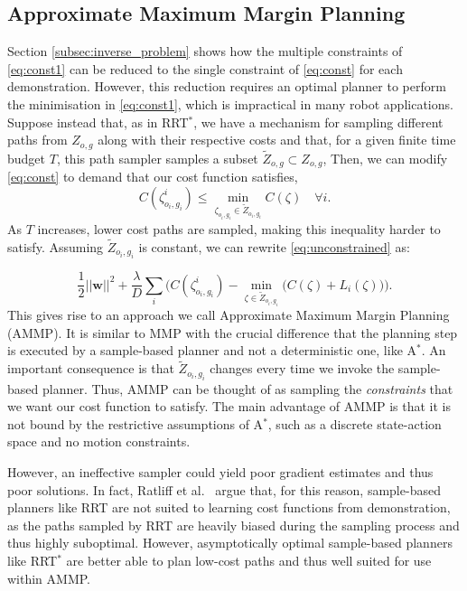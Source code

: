 \documentclass[a4paper,11pt]{report}
\begin{document}
\subsection{Approximate Maximum Margin Planning \label{subsec:ammp}}

Section \ref{subsec:inverse_problem} shows how the multiple constraints of \eqref{eq:const1} can be reduced to the single constraint of \eqref{eq:const} for each demonstration. However, this reduction requires an optimal planner to perform the minimisation in \eqref{eq:const1}, which is impractical in many robot applications. Suppose instead that, as in RRT$^*$, we have a mechanism for sampling different paths from $Z_{o,g}$ along with their respective costs and that, for a given finite time budget $T$, this path sampler samples a subset $\tilde{Z}_{o,g} \subset Z_{o,g}$,  Then, we can modify \eqref{eq:const} to demand that our cost function satisfies,
\begin{equation}
	C(\zeta^i_{o_i,g_i}) \leq \min_{\zeta_{o_i,g_i} \in \tilde{Z}_{o_i,g_i}} C(\zeta) \quad \forall i. \label{eq:const_rrt}
\end{equation}
	As $T$ increases, lower cost paths are sampled, making this inequality harder to satisfy. Assuming $\tilde{Z}_{o_i,g_i}$ is constant, we can rewrite \eqref{eq:unconstrained} as:

	\begin{equation} \frac{1}{2}||\mathbf{w}||^2 + \frac{\lambda}{D} \sum_i \big( C(\zeta^i_{o_i,g_i}) - \min_{\zeta \in \tilde{Z}_{o_i,g_i}}\big(C(\zeta) + L_i(\zeta)\big) \big). \label{eq:unconstrained_rrt}
	\end{equation}
This gives rise to an approach we call Approximate Maximum Margin Planning (AMMP). It is similar  to MMP with the crucial difference that the planning step is executed by a sample-based planner and not a deterministic one, like A$^*$. An important consequence is that $\tilde{Z}_{o_i,g_i}$ changes every time we invoke the sample-based planner. Thus, AMMP can be thought of as sampling the \emph{constraints} that we want our cost function to satisfy. The main advantage of AMMP is that it is not bound by the restrictive assumptions of  A$^*$, such as a discrete state-action space and no motion constraints. 

However, an ineffective sampler could yield poor gradient estimates and thus poor solutions. In fact, Ratliff et al.\ \cite{ratliff2009chomp} argue that, for this reason, sample-based planners like RRT are not suited to learning cost functions from demonstration, as the paths sampled by RRT are heavily biased during the sampling process and thus highly suboptimal. However, asymptotically optimal sample-based planners like RRT$^*$ are better able to plan low-cost paths \cite{karaman2011sampling} and thus well suited for use within AMMP.
\end{document}
